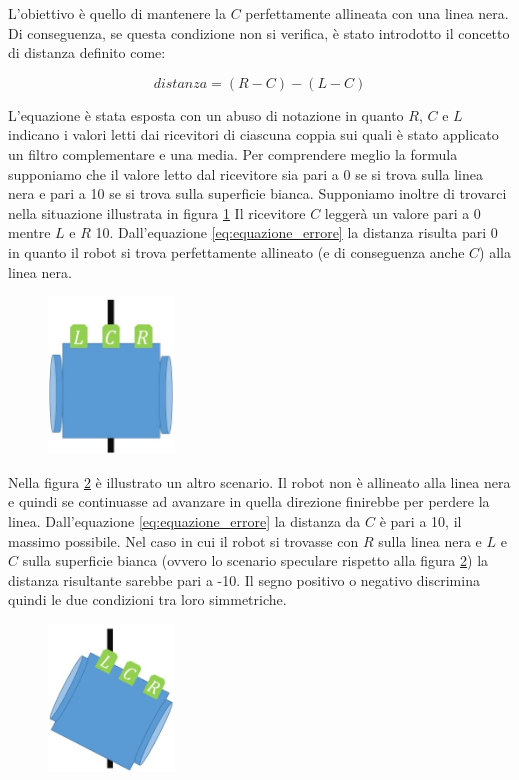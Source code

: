 \documentclass[twoside,twocolumn]{article}
\begin{document}
L'obiettivo è quello di mantenere la $C$ perfettamente allineata con una linea nera. Di conseguenza, se questa condizione non si verifica, è stato introdotto il concetto di distanza definito come:

\begin{equation} \label{eq:equazione_errore}
distanza = (R - C) - (L - C)
\end{equation}

L'equazione è stata esposta con un abuso di notazione in quanto $R$, $C$ e $L$ indicano i valori letti dai ricevitori di ciascuna coppia sui quali è stato applicato un filtro complementare e una media. Per comprendere meglio la formula supponiamo che il valore letto dal ricevitore sia pari a 0 se si trova sulla linea nera e pari a 10 se si trova sulla superficie bianca. Supponiamo inoltre di trovarci nella situazione illustrata in figura \ref{fig:t0}
Il ricevitore $C$ leggerà un valore pari a 0 mentre $L$ e $R$ 10. Dall'equazione \ref{eq:equazione_errore} la distanza risulta pari 0 in quanto il robot si trova perfettamente allineato (e di conseguenza anche $C$) alla linea nera.

\begin{figure}[h]
	\centering
	\includegraphics[width=0.3\textwidth]{immagini/t0}
	\caption{}
	\label{fig:t0}
\end{figure}

Nella figura \ref{fig:t1} è illustrato un altro scenario. Il robot non è allineato alla linea nera e quindi se continuasse ad avanzare in quella direzione finirebbe per perdere la linea. Dall'equazione \ref{eq:equazione_errore} la distanza da $C$ è pari a 10, il massimo possibile. Nel caso in cui il robot si trovasse con $R$ sulla linea nera e $L$ e $C$ sulla superficie bianca (ovvero lo scenario speculare rispetto alla figura \ref{fig:t1}) la distanza risultante sarebbe pari a -10. Il segno positivo o negativo discrimina quindi le due condizioni tra loro simmetriche.

\begin{figure}[h]
	\centering
	\includegraphics[width=0.3\textwidth]{immagini/t1}
	\caption{}
	\label{fig:t1}
\end{figure}
\end{document}
